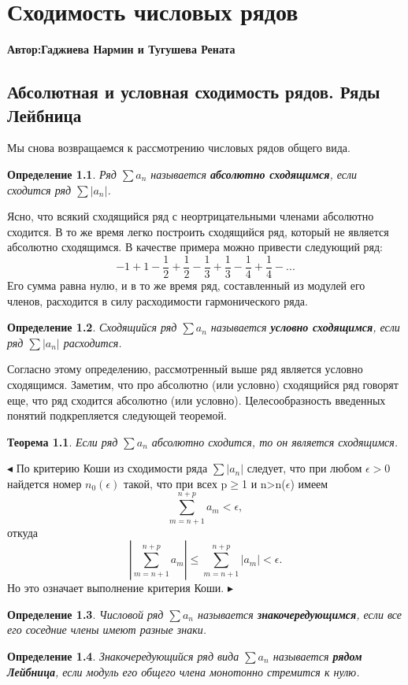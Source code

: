 \documentclass[12pt,titlepage]{report}
\newtheorem{object}{Определение}
\newtheorem{theorem}{Теорема}
\begin{document}
\chapter{Сходимость числовых рядов}
\centerline{ \bf Автор:Гаджиева Нармин и Тугушева Рената} \vskip 1cm
\section{Абсолютная и условная сходимость рядов. Ряды Лейбница }


Мы снова возвращаемся к рассмотрению числовых рядов общего вида.
\begin{object}Ряд $\sum a_{n}$ называется \textbf{абсолютно сходящимся}, если сходится ряд $\sum|a_{n}|$.\end{object}
Ясно, что всякий сходящийся ряд с неортрицательными членами абсолютно сходится. В то же время легко построить сходящийся ряд,
который не является абсолютно сходящимся. В качестве примера можно привести следующий ряд: $$-1+1-\dfrac12+\dfrac12-\dfrac13+\dfrac13-\dfrac14+\dfrac14-...$$ Его сумма равна нулю, и в то же время ряд, составленный из модулей его членов, расходится в силу расходимости гармонического ряда.
\begin{object}
Сходящийся ряд $\sum a_{n}$ называется \textbf{условно сходящимся}, если ряд $\sum|a_{n}|$ расходится.
\end{object}
Согласно этому определению, рассмотренный выше ряд является условно сходящимся. Заметим, что про абсолютно (или условно) сходящийся ряд говорят еще, что ряд сходится абсолютно (или условно). Целесообразность введенных понятий подкрепляется следующей теоремой.
\begin{theorem}Если ряд $\sum a_{n}$ абсолютно сходится, то он является сходящимся.\end{theorem}
$\blacktriangleleft$ По критерию Коши из сходимости ряда $\sum |a_{n}|$ следует, что при любом $\epsilon>0$ найдется номер $n_{0}(\epsilon)$ такой, что при всех p$\ge$1 и n>n($\epsilon$) имеем $$\sum_{m=n+1}^{n+p} a_{m}<\epsilon,$$ откуда $$|\sum_{m=n+1}^{n+p} a_{m}|\le\sum_{m=n+1}^{n+p} |a_{m}|<\epsilon.$$ Но это означает выполнение критерия Коши. $\blacktriangleright$
\begin{object}Числовой ряд $\sum a_{n}$ называется \textbf{знакочередующимся}, если все его соседние члены имеют разные знаки.\end{object}
\begin{object}Знакочередующийся ряд вида $\sum a_{n}$ называется \textbf{рядом Лейбница}, если модуль его общего члена монотонно стремится к нулю.\end{object}
\end{document}
